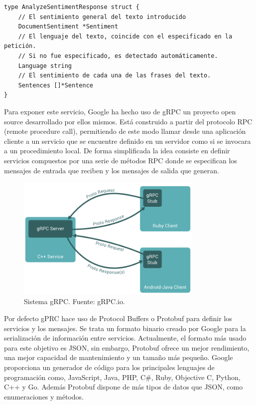\begin{lstlisting}[caption= Respuesta del servicio de NLP]
type AnalyzeSentimentResponse struct {
    // El sentimiento general del texto introducido
    DocumentSentiment *Sentiment
    // El lenguaje del texto, coincide con el especificado en la petición.
    // Si no fue especificado, es detectado automáticamente.
    Language string
    // El sentimiento de cada una de las frases del texto.
    Sentences []*Sentence
}
\end{lstlisting}
Para exponer este servicio, Google ha hecho uso de gRPC un proyecto open source desarrollado por ellos mismos. Está construido a partir del protocolo RPC (remote procedure call), permitiendo de este modo llamar desde una aplicación cliente a un servicio que se encuentre definido en un servidor como si se invocara a un procedimiento local. De forma simplificada la idea consiste en definir servicios compuestos por una serie de métodos RPC donde se especifican los mensajes de entrada que reciben y los mensajes de salida que generan.

\begin{figure}[ht]
\begin{center}
\includegraphics[width = 0.80\textwidth]{Figuras/gRPC.PNG}
\end{center}
\caption{\label{fig:grpc} Sistema gRPC. Fuente: gRPC.io.}
\end{figure}

Por defecto gPRC hace uso de Protocol Buffers o Protobuf para definir los servicios y los mensajes. Se trata un formato binario creado por Google para la serialización de información entre servicios. Actualmente, el formato más usado para este objetivo es JSON, sin embargo, Protobuf ofrece un mejor rendimiento, una mejor capacidad de mantenimiento y un tamaño más pequeño. Google proporciona un generador de código para los principales lenguajes de programación como, JavaScript, Java, PHP, C\#, Ruby, Objective C, Python, C++ y Go. Además Protobuf dispone de más tipos de datos que JSON, como enumeraciones y métodos.

